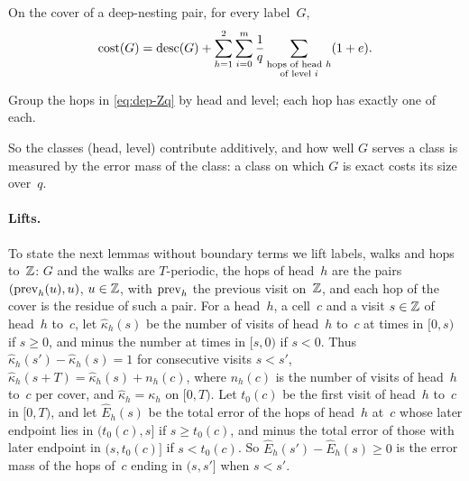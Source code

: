 \begin{corollary}\label{cor:dep-split}
\notformalized
On the cover of a deep-nesting pair, for every label~$G$,
\[
  \mathrm{cost}(G)=\mathrm{desc}(G)+\sum_{h=1}^{2}\sum_{i=0}^{m}\frac1q\sum_{\substack{\text{hops of head }h\\\text{of level
}i}}
  (1+e).
\]
\end{corollary}

\begin{informalproof}
Group the hops in \eqref{eq:dep-Zq} by head and level; each hop has exactly one of each.
\end{informalproof}

So the classes (head, level) contribute additively, and how well $G$ serves a class is measured by the error mass of
the class: a class on which $G$ is exact costs its size over~$q$.

\paragraph{Lifts.} To state the next lemmas without boundary terms we lift labels, walks and hops to~$\mathbb{Z}$: $G$ and the
walks are $T$-periodic, the hops of head~$h$ are the pairs $(\mathrm{prev}_h(u),u)$, $u\in\mathbb{Z}$, with $\mathrm{prev}_h$ the previous
visit on~$\mathbb{Z}$, and each hop of the cover is the residue of such a pair. For a head~$h$, a cell~$c$ and a visit
$s\in\mathbb{Z}$ of head~$h$ to~$c$, let $\hat\kappa_h(s)$ be the number of visits of head~$h$ to~$c$ at times in $[0,s)$ if
$s\ge0$, and minus the number at times in $[s,0)$ if $s<0$. Thus $\hat\kappa_h(s')-\hat\kappa_h(s)=1$ for consecutive
visits $s<s'$, $\hat\kappa_h(s+T)=\hat\kappa_h(s)+n_h(c)$, where $n_h(c)$ is the number of visits of head~$h$ to~$c$ per
cover, and $\hat\kappa_h=\kappa_h$ on $[0,T)$. Let $t_0(c)$ be the first visit of head~$h$ to~$c$ in $[0,T)$, and let
$\hat E_h(s)$ be the total error of the hops of head~$h$ at~$c$ whose later endpoint lies in $(t_0(c),s]$ if
$s\ge t_0(c)$, and minus the total error of those with later endpoint in $(s,t_0(c)]$ if $s<t_0(c)$. So
$\hat E_h(s')-\hat E_h(s)\ge0$ is the error mass of the hops of~$c$ ending in $(s,s']$ when $s<s'$.

